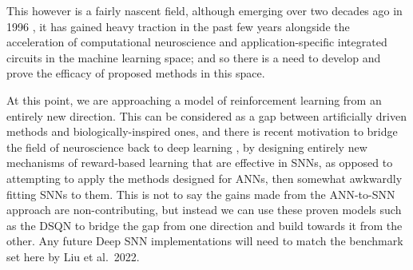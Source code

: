 \documentclass[journal,onecolumn]{IEEEtran}
\begin{document}
This however is a fairly nascent field, although emerging over two decades
ago in 1996 \autocite{maassNetworksSpikingNeurons1997}, it has gained
heavy traction in the past few years
\autocite{princeCurrentStateFuture2022}
\autocite{mehonicBraininspiredComputingNeeds2022} alongside
the acceleration of computational neuroscience and application-specific
integrated circuits in the machine learning space; and so there is a need
to develop and prove the efficacy of proposed methods in this space.

At this point, we are approaching a model of reinforcement learning from
an entirely new direction. This can be considered as a gap between
artificially driven methods and biologically-inspired ones, and there is
recent motivation to bridge the field of neuroscience back to deep
learning \autocite{zenkeVisualizingJointFuture2021} , by designing
entirely new mechanisms of reward-based learning that are effective in
SNNs, as opposed to attempting to apply the methods designed for ANNs,
then somewhat awkwardly fitting SNNs to them. This is not to say the
gains made from the ANN-to-SNN approach are non-contributing, but
instead we can use these proven models such as the DSQN to bridge the
gap from one direction and build towards it from the other. Any future
Deep SNN implementations will need to match the benchmark set here by
Liu et al.~2022.

 





%
%
\end{document}
